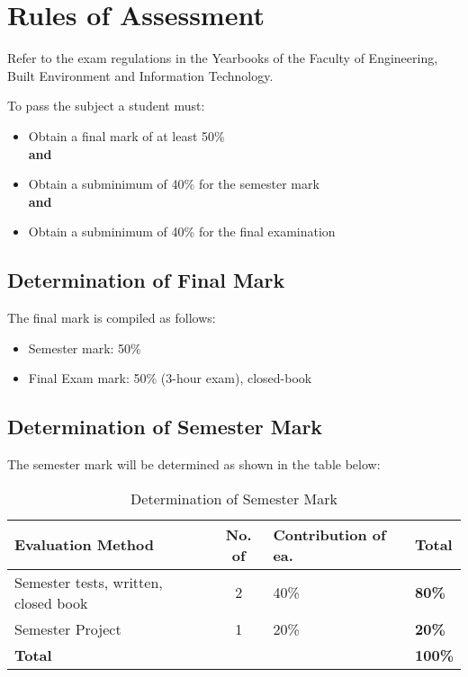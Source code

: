 \section{Rules of Assessment}
    Refer to the exam regulations in the Yearbooks of the Faculty of Engineering,
    Built Environment and Information Technology.

    To pass the subject a student must:
    \begin{itemize}
        \item Obtain a final mark of at least 50\% \\ {\bf and}
        \item Obtain a subminimum of 40\% for the semester mark \\ {\bf and}
        \item Obtain a subminimum of 40\% for the final examination
    \end{itemize}
    
    \subsection{Determination of Final Mark}
        The final mark is compiled as follows:
        \begin{itemize}
            \item Semester mark: 50\%
            \item Final Exam mark: 50\% (3-hour exam), closed-book
        \end{itemize}

    \subsection{Determination of Semester Mark}
        The semester mark will be determined as shown in the table below:
        \begin{table}[!h]
            \begin{center}
             \begin{tabular}{|p{5cm}|c|l|l|}
                 \hline
                 {\bf Evaluation Method} & {\bf No. of} & 
                 {\bf Contribution of ea.} & {\bf Total} \\
                 \hline
                 Semester tests, written, closed book 
                    & 2 & 40\% & {\bf 80\%} \\ \hline
                 Semester Project 
                    & 1 & 20\% & {\bf 20\%} \\
                 \hline
                 \multicolumn{3}{|l|}{{\bf Total}} & {\bf 100\%} \\
                 \hline
             \end{tabular}
             \caption{Determination of Semester Mark}
            \end{center}
        \end{table}
    
